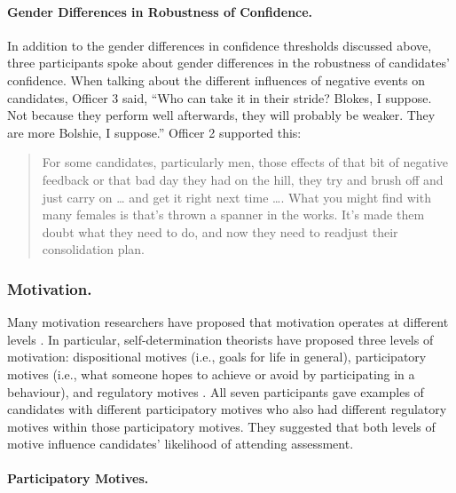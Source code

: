 \documentclass[
  12pt,
  a4paper,
]{book}
\begin{document}
\hypertarget{gender-differences-in-robustness-of-confidence.}{%
\paragraph{Gender Differences in Robustness of Confidence.}\label{gender-differences-in-robustness-of-confidence.}}

In addition to the gender differences in confidence thresholds discussed above, three participants spoke about gender differences in the robustness of candidates' confidence. When talking about the different influences of negative events on candidates, Officer 3 said, ``Who can take it in their stride? Blokes, I suppose. Not because they perform well afterwards, they will probably be weaker. They are more Bolshie, I suppose.'' Officer 2 supported this:

\begin{quote}
For some candidates, particularly men, those effects of that bit of negative feedback or that bad day they had on the hill, they try and brush off and just carry on \ldots{} and get it right next time \ldots. What you might find with many females is that's thrown a spanner in the works. It's made them doubt what they need to do, and now they need to readjust their consolidation plan.
\end{quote}

\hypertarget{qual-gta-motivation}{%
\subsubsection{Motivation.}\label{qual-gta-motivation}}

Many motivation researchers have proposed that motivation operates at different levels \citep[e.g.,][]{Vallerand1997, Vallerand1992}. In particular, self-determination theorists have proposed three levels of motivation: dispositional motives (i.e., goals for life in general), participatory motives (i.e., what someone hopes to achieve or avoid by participating in a behaviour), and regulatory motives \citep[i.e., the perceived loci of causality of behavioural goals; e.g.,][]{Deci2000, Ingledew2009}. All seven participants gave examples of candidates with different participatory motives who also had different regulatory motives within those participatory motives. They suggested that both levels of motive influence candidates' likelihood of attending assessment.

\hypertarget{qual-part-motives}{%
\paragraph{Participatory Motives.}\label{qual-part-motives}}
\end{document}
